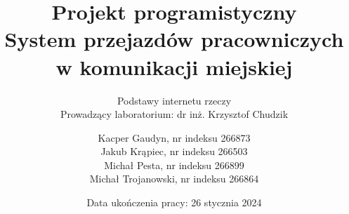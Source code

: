 \documentclass[10pt, a4paper, titlepage]{article}
\title{
  Projekt programistyczny \\
  System przejazdów pracowniczych w komunikacji miejskiej
}
\subtitle{
  Podstawy internetu rzeczy \\
  Prowadzący laboratorium: dr inż. Krzysztof Chudzik
}
\author{
  Kacper Gaudyn, nr indeksu 266873 \\
  Jakub Krąpiec, nr indeksu 266503 \\
  Michał Pesta, nr indeksu 266899 \\
  Michał Trojanowski, nr indeksu 266864
}
\date{Data ukończenia pracy: 26 stycznia 2024}
\begin{document}
  \begin{titlingpage}
    \maketitle
  \end{titlingpage}
  \tableofcontents

  \newpage
  
  
  
  
  
  
  
\end{document}
